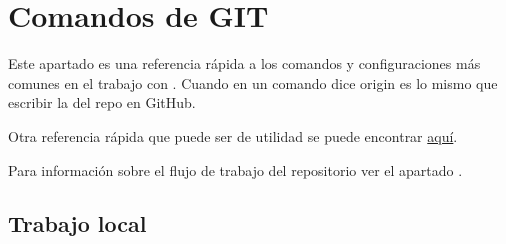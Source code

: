 
\section{Comandos de GIT}\label{anexo-git}

Este apartado es una referencia rápida a los comandos y configuraciones más comunes en el trabajo con . Cuando en un comando dice origin es lo mismo que escribir la  del repo en GitHub.

\noindent Otra referencia rápida que puede ser de utilidad se puede encontrar \href{https://rogerdudler.github.io/git-guide}{aquí}.

\noindent Para información sobre el flujo de trabajo del repositorio ver el apartado .


\subsection{Trabajo local}

